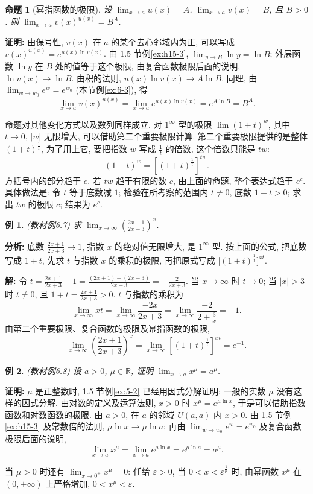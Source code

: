 \documentclass[UTF8,openany]{ctexbook}
\theoremstyle{chinesetextbook}
\newtheorem{example}{例}[section]
\newenvironment{cnproof}{\par\indent\textbf{证明:} \ignorespaces}{\par}
\newenvironment{cnsolution}{\par\indent\textbf{解:} \ignorespaces}{\par}
\newtheorem*{propositionsingle}{命题}
\begin{document}
\begin{propositionsingle}[幂指函数的极限]
设 $\displaystyle\lim_{x\to a}u(x)=A$, $\displaystyle\lim_{x\to a}v(x)=B$, 且 $B>0$. 则 $\displaystyle\lim_{x\to a}v(x)^{u(x)}=B^A$.
\end{propositionsingle}
\begin{cnproof}
由保号性, $v(x)$ 在 $a$ 的某个去心邻域内为正, 可以写成 $v(x)^{u(x)}=e^{u(x)\ln v(x)}$. 由 1.5 节例\ref{ex:h15-3}, $\displaystyle\lim_{y\to B}\ln y=\ln B$; 外层函数 $\ln y$ 在 $B$ 处的值等于这个极限, 由复合函数极限后面的说明, $\ln v(x)\to\ln B$. 由积的法则, $u(x)\ln v(x)\to A\ln B$. 同理, 由 $\displaystyle\lim_{w\to w_0}e^w=e^{w_0}$ (本节例\ref{ex:6-3}), 得
\[
\lim_{x\to a}v(x)^{u(x)}=\lim_{x\to a}e^{u(x)\ln v(x)}=e^{A\ln B}=B^A.
\]
\end{cnproof}
命题对其他变化方式以及数列同样成立. 对 $1^\infty$ 型的极限 $\displaystyle\lim(1+t)^w$, 其中 $t\to0$, $|w|$ 无限增大, 可以借助第二个重要极限计算. 第二个重要极限提供的是整体 $(1+t)^{\frac1t}$, 为了用上它, 要把指数 $w$ 写成 $\displaystyle\frac1t$ 的倍数, 这个倍数只能是 $tw$:
\[
(1+t)^w=\left[(1+t)^{\frac1t}\right]^{tw}.
\]
方括号内的部分趋于 $e$. 若 $tw$ 趋于有限的数 $c$, 由上面的命题, 整个表达式趋于 $e^c$. 具体做法是: 令 $t$ 等于底数减 $1$; 检验在所考察的范围内 $t\ne0$, 底数 $1+t>0$; 求出 $tw$ 的极限 $c$; 结果为 $e^c$.
\begin{example}\label{ex:6-7}
\textnormal{(教材例6.7)} 求 $\displaystyle\lim_{x\to\infty}\left(\frac{2x+1}{2x+3}\right)^x$.
\end{example}
\par\indent\textbf{分析:} 底数 $\displaystyle\frac{2x+1}{2x+3}\to1$, 指数 $x$ 的绝对值无限增大, 是 $1^\infty$ 型. 按上面的公式, 把底数写成 $1+t$, 先求 $t$ 与指数 $x$ 的乘积的极限, 再把原式写成 $\bigl[(1+t)^{\frac1t}\bigr]^{xt}$.
\begin{cnsolution}
令 $\displaystyle t=\frac{2x+1}{2x+3}-1=\frac{(2x+1)-(2x+3)}{2x+3}=-\frac2{2x+3}$. 当 $x\to\infty$ 时 $t\to0$; 当 $|x|>3$ 时 $t\ne0$, 且 $\displaystyle1+t=\frac{2x+1}{2x+3}>0$. $t$ 与指数的乘积为
\[
\lim_{x\to\infty}xt=\lim_{x\to\infty}\frac{-2x}{2x+3}=\lim_{x\to\infty}\frac{-2}{2+\frac3x}=-1.
\]
由第二个重要极限、复合函数的极限及幂指函数的极限,
\[
\lim_{x\to\infty}\left(\frac{2x+1}{2x+3}\right)^x=\lim_{x\to\infty}\left[(1+t)^{\frac1t}\right]^{xt}=e^{-1}.
\]
\end{cnsolution}
\begin{example}\label{ex:6-8}
\textnormal{(教材例6.8)} 设 $a>0$, $\mu\in\mathbb R$, 证明 $\displaystyle\lim_{x\to a}x^\mu=a^\mu$.
\end{example}
\begin{cnproof}
$\mu$ 是正整数时, 1.5 节例\ref{ex:5-2} 已经用因式分解证明; 一般的实数 $\mu$ 没有这样的因式分解. 由对数的定义及运算法则, $x>0$ 时 $x^\mu=e^{\mu\ln x}$, 于是可以借助指数函数和对数函数的极限. 由 $a>0$, 在 $a$ 的邻域 $U(a,a)$ 内 $x>0$. 由 1.5 节例\ref{ex:h15-3} 及常数倍的法则, $\mu\ln x\to\mu\ln a$; 再由 $\displaystyle\lim_{w\to w_0}e^w=e^{w_0}$ 及复合函数极限后面的说明,
\[
\lim_{x\to a}x^\mu=\lim_{x\to a}e^{\mu\ln x}=e^{\mu\ln a}=a^\mu.
\]
\end{cnproof}
当 $\mu>0$ 时还有 $\displaystyle\lim_{x\to0^+}x^\mu=0$: 任给 $\varepsilon>0$, 当 $0<x<\varepsilon^{\frac1\mu}$ 时, 由幂函数 $x^\mu$ 在 $(0,+\infty)$ 上严格增加, $0<x^\mu<\varepsilon$.
\end{document}
